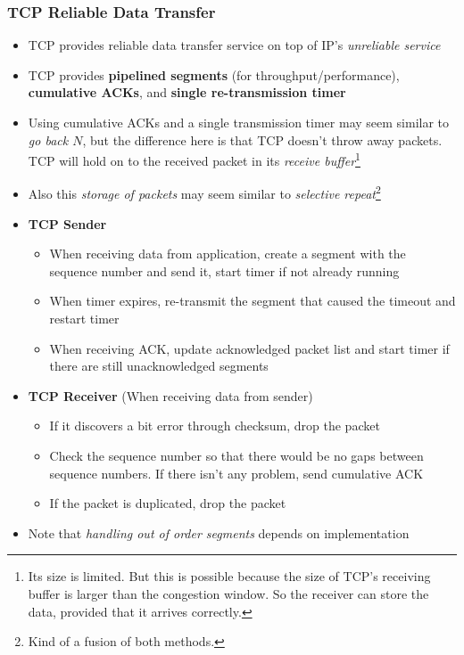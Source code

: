 \subsubsection{TCP Reliable Data Transfer}
\begin{itemize}
	\item TCP provides reliable data transfer service on top of IP's \textit{unreliable service}
	\item TCP provides \textbf{pipelined segments} (for throughput/performance), \textbf{cumulative ACKs}, and \textbf{single re-transmission timer}
	\item Using cumulative ACKs and a single transmission timer may seem similar to \textit{go back $N$}, but the difference here is that TCP doesn't throw away packets. TCP will hold on to the received packet in its \textit{receive buffer}\footnote{Its size is limited. But this is possible because the size of TCP's receiving buffer is larger than the congestion window. So the receiver can store the data, provided that it arrives correctly.}
	\item Also this \textit{storage of packets} may seem similar to \textit{selective repeat}\footnote{Kind of a fusion of both methods.}
\end{itemize}

\begin{itemize}
	\item \textbf{TCP Sender}
	\begin{itemize}
		\item When receiving data from application, create a segment with the sequence number and send it, start timer if not already running
		\item When timer expires, re-transmit the segment that caused the timeout and restart timer
		\item When receiving ACK, update acknowledged packet list and start timer if there are still unacknowledged segments
	\end{itemize}
	\item \textbf{TCP Receiver} (When receiving data from sender)
	\begin{itemize}
		\item If it discovers a bit error through checksum, drop the packet
		\item Check the sequence number so that there would be no gaps between sequence numbers. If there isn't any problem, send cumulative ACK
		\item If the packet is duplicated, drop the packet
	\end{itemize}
	\item Note that \textit{handling out of order segments} depends on implementation
\end{itemize}

